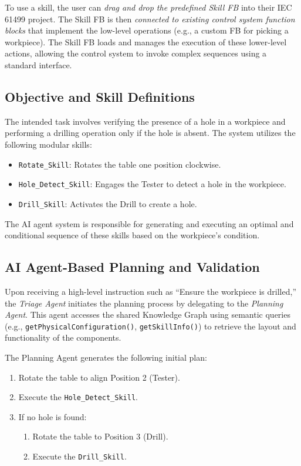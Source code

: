 \begin{bibunit}
    
    To use a skill, the user can \textit{drag and drop the predefined Skill FB} into their IEC 61499 project. The Skill FB is then \textit{connected to existing control system function blocks} that implement the low-level operations (e.g., a custom FB for picking a workpiece). The Skill FB loads and manages the execution of these lower-level actions, allowing the control system to invoke complex sequences using a standard interface.
    
    
    \subsection{Objective and Skill Definitions}
    The intended task involves verifying the presence of a hole in a workpiece and performing a drilling operation only if the hole is absent. The system utilizes the following modular skills:
    \begin{itemize}
        \item \texttt{Rotate\_Skill}: Rotates the table one position clockwise.
        \item \texttt{Hole\_Detect\_Skill}: Engages the Tester to detect a hole in the workpiece.
        \item \texttt{Drill\_Skill}: Activates the Drill to create a hole.
    \end{itemize}
    
    The AI agent system is responsible for generating and executing an optimal and conditional sequence of these skills based on the workpiece's condition.
    
    \subsection{AI Agent-Based Planning and Validation}
    Upon receiving a high-level instruction such as ``Ensure the workpiece is drilled,'' the \textit{Triage Agent} initiates the planning process by delegating to the \textit{Planning Agent}. This agent accesses the shared Knowledge Graph using semantic queries (e.g., \texttt{getPhysicalConfiguration()}, \texttt{getSkillInfo()}) to retrieve the layout and functionality of the components.
    
    The Planning Agent generates the following initial plan:
    \begin{enumerate}
        \item Rotate the table to align Position 2 (Tester).
        \item Execute the \texttt{Hole\_Detect\_Skill}.
        \item If no hole is found:
        \begin{enumerate}
            \item Rotate the table to Position 3 (Drill).
            \item Execute the \texttt{Drill\_Skill}.
        \end{enumerate}
    \end{enumerate}
    

\end{bibunit}
